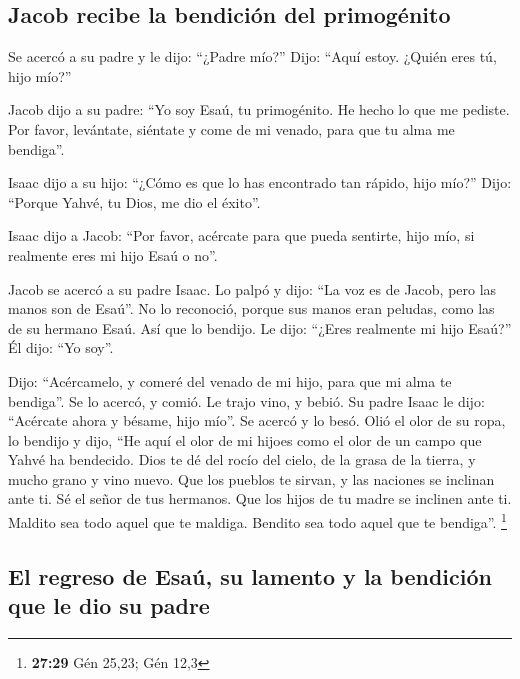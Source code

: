 \begin{paracol}{2}
\hypertarget{jacob-recibe-la-bendiciuxf3n-del-primoguxe9nito}{%
\subsection{Jacob recibe la bendición del
primogénito}\label{jacob-recibe-la-bendiciuxf3n-del-primoguxe9nito}}

 Se acercó a su padre y le dijo: ``¿Padre mío?'' Dijo:
``Aquí estoy. ¿Quién eres tú, hijo mío?''

 Jacob dijo a su padre: ``Yo soy Esaú, tu primogénito. He
hecho lo que me pediste. Por favor, levántate, siéntate y come de mi
venado, para que tu alma me bendiga''.

 Isaac dijo a su hijo: ``¿Cómo es que lo has encontrado
tan rápido, hijo mío?'' Dijo: ``Porque Yahvé, tu Dios, me dio el
éxito''.

 Isaac dijo a Jacob: ``Por favor, acércate para que pueda
sentirte, hijo mío, si realmente eres mi hijo Esaú o no''.

 Jacob se acercó a su padre Isaac. Lo palpó y dijo: ``La
voz es de Jacob, pero las manos son de Esaú''.  No lo
reconoció, porque sus manos eran peludas, como las de su hermano Esaú.
Así que lo bendijo.  Le dijo: ``¿Eres realmente mi hijo
Esaú?'' Él dijo: ``Yo soy''.

 Dijo: ``Acércamelo, y comeré del venado de mi hijo, para
que mi alma te bendiga''. Se lo acercó, y comió. Le trajo vino, y bebió.
 Su padre Isaac le dijo: ``Acércate ahora y bésame, hijo
mío''.  Se acercó y lo besó. Olió el olor de su ropa, lo
bendijo y dijo, ``He aquí el olor de mi hijoes como el olor de un campo
que Yahvé ha bendecido.  Dios te dé del rocío del cielo,
de la grasa de la tierra, y mucho grano y vino nuevo. 
Que los pueblos te sirvan, y las naciones se inclinan ante ti. Sé el
señor de tus hermanos. Que los hijos de tu madre se inclinen ante ti.
Maldito sea todo aquel que te maldiga. Bendito sea todo aquel que te
bendiga''. \footnote{\textbf{27:29} Gén 25,23; Gén 12,3}

\hypertarget{el-regreso-de-esauxfa-su-lamento-y-la-bendiciuxf3n-que-le-dio-su-padre}{%
\subsection{El regreso de Esaú, su lamento y la bendición que le dio su
padre}\label{el-regreso-de-esauxfa-su-lamento-y-la-bendiciuxf3n-que-le-dio-su-padre}}


\end{paracol}
